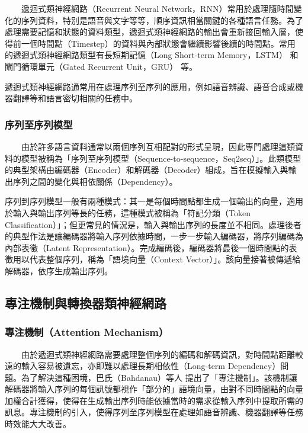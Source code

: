 　　遞迴式類神經網路（Recurrent Neural Network，RNN）常用於處理隨時間變化的序列資料，特別是語音與文字等等，順序資訊相當關鍵的各種語言任務。為了處理需要記憶和狀態的資料類型，遞迴式類神經網路的輸出會重新接回輸入層，使得前一個時間點（Timestep）的資料與內部狀態會繼續影響後續的時間點。常用的遞迴式類神經網路類型有長短期記憶（Long Short-term Memory，LSTM）\cite{hochreiter1997long} 和閘門循環單元（Gated Recurrent Unit，GRU）\cite{cho-etal-2014-properties} 等。

        遞迴式類神經網路通常用在處理序列至序列的應用，例如語音辨識、語音合成或機器翻譯等和語言密切相關的任務中。

\subsubsection{序列至序列模型}

　　由於許多語言資料通常以兩個序列互相配對的形式呈現，因此專門處理這類資料的模型被稱為「序列至序列模型（Sequence-to-sequence，Seq2seq）」\cite{sutskever2014sequence}。此類模型的典型架構由編碼器（Encoder）和解碼器（Decoder）組成，旨在模擬輸入與輸出序列之間的變化與相依關係（Dependency）。

        序列到序列模型一般有兩種模式：其一是每個時間點都生成一個輸出的向量，適用於輸入與輸出序列等長的任務，這種模式被稱為「符記分類（Token Classification）」；但更常見的情況是，輸入與輸出序列的長度並不相同。處理後者的典型作法是讓編碼器將輸入序列依據時間，一步一步輸入編碼器，將序列編碼為內部表徵（Latent Representation）。完成編碼後，編碼器將最後一個時間點的表徵用以代表整個序列，稱為「語境向量（Context Vector）」。該向量接著被傳遞給解碼器，依序生成輸出序列。

\subsection{專注機制與轉換器類神經網路}

\subsubsection{專注機制（Attention Mechanism）}

　　由於遞迴式類神經網路需要處理整個序列的編碼和解碼資訊，對時間點距離較遠的輸入容易被遺忘，亦即難以處理長期相依性（Long-term Dependency）問題。為了解決這種困境，巴氏（Bahdanau）等人\cite{bahdanau2014neural} 提出了「專注機制」。該機制讓解碼器將輸入序列的每個訊號都視作「部分的」語境向量，由對不同時間點的向量加權合計獲得，使得在生成輸出序列時能依據當時的需求從輸入序列中提取所需的訊息。專注機制的引入，使得序列至序列模型在處理如語音辨識、機器翻譯等任務時效能大大改善。


